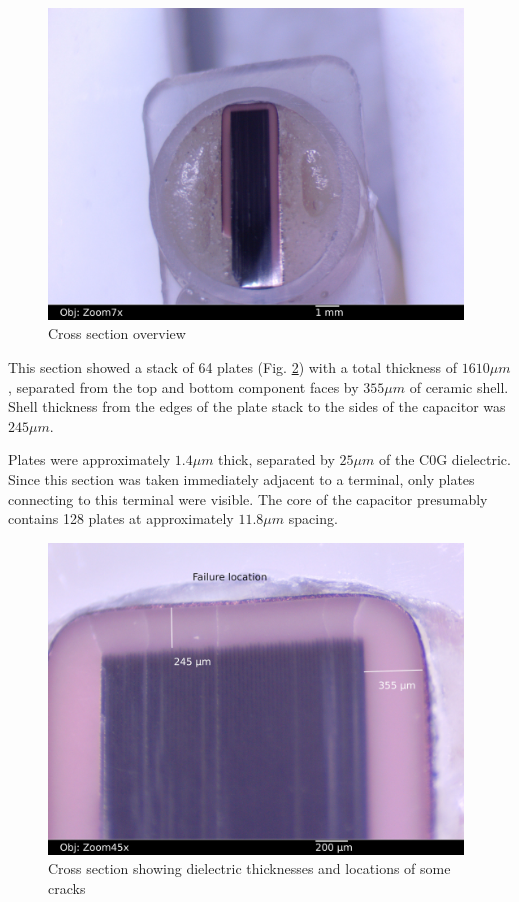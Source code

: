 \documentclass{article}
\begin{document}
\begin{figure}[h]
\includegraphics[width=11cm,keepaspectratio]{07-section1-7x_annotated.jpg}
\caption{Cross section overview}
\label{section-overview}
\end{figure}

This section showed a stack of 64 plates (Fig. \ref{section-plates}) with a total thickness of $1610 \mu m$, separated
from the top and bottom component faces by $355 \mu m$ of ceramic shell. Shell thickness from the edges of the plate
stack to the sides of the capacitor was $245 \mu m$.

Plates were approximately $1.4 \mu m$ thick, separated by $25 \mu m$ of the C0G dielectric. Since this section was
taken immediately adjacent to a terminal, only plates connecting to this terminal were visible. The core of the
capacitor presumably contains 128 plates at approximately $11.8 \mu m$ spacing.

\begin{figure}[h]
\includegraphics[width=11cm,keepaspectratio]{06-section1-45x_annotated2.jpg}
\caption{Cross section showing dielectric thicknesses and locations of some cracks}
\label{section-plates}
\end{figure}
\end{document}
